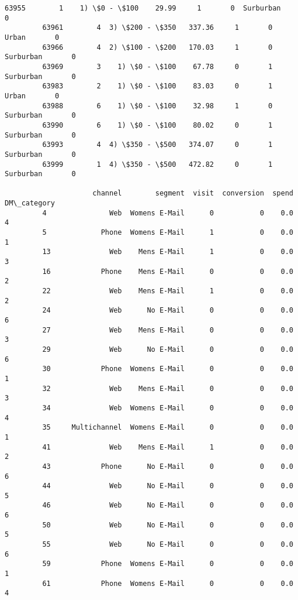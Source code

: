 \documentclass[11pt]{article}
\begin{document}
\begin{Verbatim}[commandchars=\\\{\}]
         63955        1    1) \$0 - \$100    29.99     1       0  Surburban       0   
         63961        4  3) \$200 - \$350   337.36     1       0      Urban       0   
         63966        4  2) \$100 - \$200   170.03     1       0  Surburban       0   
         63969        3    1) \$0 - \$100    67.78     0       1  Surburban       0   
         63983        2    1) \$0 - \$100    83.03     0       1      Urban       0   
         63988        6    1) \$0 - \$100    32.98     1       0  Surburban       0   
         63990        6    1) \$0 - \$100    80.02     0       1  Surburban       0   
         63993        4  4) \$350 - \$500   374.07     0       1  Surburban       0   
         63999        1  4) \$350 - \$500   472.82     0       1  Surburban       0   
         
                     channel        segment  visit  conversion  spend  DM\_category  
         4               Web  Womens E-Mail      0           0    0.0            4  
         5             Phone  Womens E-Mail      1           0    0.0            1  
         13              Web    Mens E-Mail      1           0    0.0            3  
         16            Phone    Mens E-Mail      0           0    0.0            2  
         22              Web    Mens E-Mail      1           0    0.0            2  
         24              Web      No E-Mail      0           0    0.0            6  
         27              Web    Mens E-Mail      0           0    0.0            3  
         29              Web      No E-Mail      0           0    0.0            6  
         30            Phone  Womens E-Mail      0           0    0.0            1  
         32              Web    Mens E-Mail      0           0    0.0            3  
         34              Web  Womens E-Mail      0           0    0.0            4  
         35     Multichannel  Womens E-Mail      0           0    0.0            1  
         41              Web    Mens E-Mail      1           0    0.0            2  
         43            Phone      No E-Mail      0           0    0.0            6  
         44              Web      No E-Mail      0           0    0.0            5  
         46              Web      No E-Mail      0           0    0.0            6  
         50              Web      No E-Mail      0           0    0.0            5  
         55              Web      No E-Mail      0           0    0.0            6  
         59            Phone  Womens E-Mail      0           0    0.0            1  
         61            Phone  Womens E-Mail      0           0    0.0            4  

\end{Verbatim}
\end{document}
